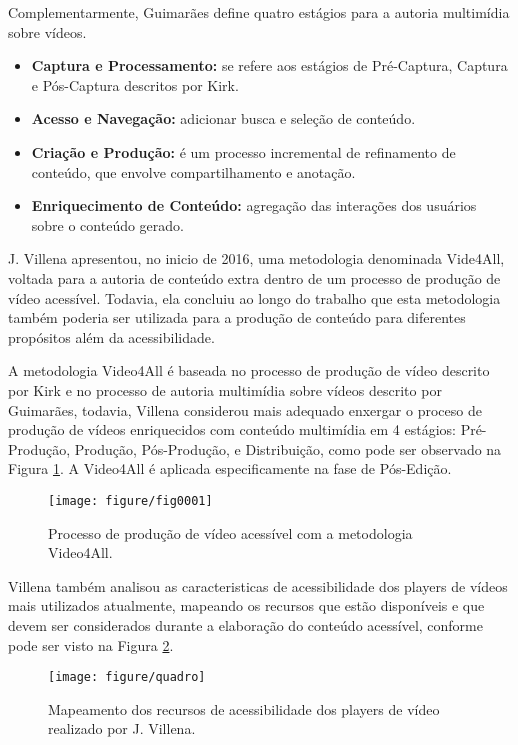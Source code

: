 \documentclass{sig-alternate}
\begin{document}
Complementarmente, Guimarães\cite{22334} define quatro estágios para a autoria multimídia sobre vídeos.

\begin{itemize}
\item \textbf{Captura e Processamento:} se refere aos estágios de Pré-Captura, Captura e Pós-Captura descritos por Kirk\cite{Kirk:2007}.
\item \textbf{Acesso e Navegação:} adicionar busca e seleção de conteúdo. 
\item \textbf{Criação e Produção:} é um processo incremental de refinamento de conteúdo, que envolve compartilhamento e anotação.
\item \textbf{Enriquecimento de Conteúdo:} agregação das interações dos usuários sobre o conteúdo gerado.
\end{itemize}


J. Villena \cite{Villena2016} apresentou, no inicio de 2016, uma metodologia denominada Vide4All, voltada para a autoria de conteúdo extra dentro de um processo de produção de vídeo acessível. Todavia, ela concluiu ao longo do trabalho que esta metodologia também poderia ser utilizada para a produção de conteúdo para diferentes propósitos além da acessibilidade. 

A metodologia Video4All é baseada no processo de produção de vídeo descrito por Kirk\cite{Kirk:2007} e no processo de autoria multimídia sobre vídeos descrito por Guimarães\cite{22334}, todavia, Villena  considerou mais adequado enxergar o proceso de produção de vídeos enriquecidos com conteúdo multimídia  em 4 estágios: Pré-Produção, Produção, Pós-Produção, e Distribuição, como pode ser observado na Figura \ref{fig0001}. A Video4All é aplicada especificamente na fase de Pós-Edição. 


\begin{figure}[!htb]
\centering
\texttt{[image: figure/fig0001]}
\caption{Processo de produção de vídeo acessível com a metodologia Video4All\cite{Villena2016}.}
\label{fig0001}
\end{figure}

Villena \cite{Villena2016} também analisou as caracteristicas de acessibilidade dos players de vídeos mais utilizados atualmente, mapeando os recursos que estão disponíveis e que devem ser considerados durante a elaboração do conteúdo acessível, conforme pode ser visto na Figura \ref{quadro}.

\begin{figure}[!htb]
\centering
\texttt{[image: figure/quadro]}
\caption{Mapeamento dos recursos de acessibilidade dos players de vídeo realizado por J. Villena\cite{Villena2016}.}
\label{quadro}
\end{figure}
\end{document}
